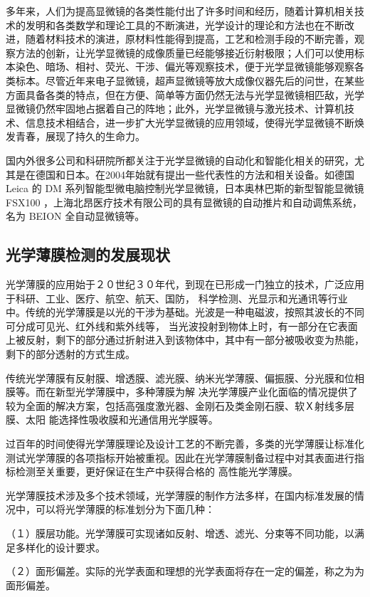 多年来，人们为提高显微镜的各类性能付出了许多时间和经历，随着计算机相关技术的发明和各类数学和理论工具的不断演进，光学设计的理论和方法也在不断改进，随着材料技术的演进，原材料性能得到提高，工艺和检测手段的不断完善，观察方法的创新，让光学显微镜的成像质量已经能够接近衍射极限；人们可以使用标本染色、暗场、相衬、荧光、干涉、偏光等观察技术，便于光学显微镜能够观察各类标本。尽管近年来电子显微镜，超声显微镜等放大成像仪器先后的问世，在某些方面具备各类的特点，但在方便、简单等方面仍然无法与光学显微镜相匹敌，光学显微镜仍然牢固地占据着自己的阵地；此外，光学显微镜与激光技术、计算机技术、信息技术相结合，进一步扩大光学显微镜的应用领域，使得光学显微镜不断焕发青春，展现了持久的生命力。

国内外很多公司和科研院所都关注于光学显微镜的自动化和智能化相关的研究，尤其是在德国和日本。在2004年始就有提出一些代表性的方法和相关设备。如德国 Leica 的 DM 系列智能型微电脑控制光学显微镜，日本奥林巴斯的新型智能显微镜 FSX100 ，上海北昂医疗技术有限公司的具有显微镜的自动推片和自动调焦系统，名为 BEION 全自动显微镜等。

\subsection{光学薄膜检测的发展现状}
光学薄膜的应用始于２０世纪３０年代，到现在已形成一门独立的技术，广泛应用于科研、工业、医疗、航空、航天、国防，
科学检测、光显示和光通讯等行业中\cite{baomo2002}。传统的光学薄膜是以光的干涉为基础。光波是一种电磁波，按照其波长的不同可分成可见光、红外线和紫外线等，
当光波投射到物体上时，有一部分在它表面上被反射，剩下的部分通过折射进入到该物体中，其中有一部分被吸收变为热能，剩下的部分透射的方式生成。

传统光学薄膜有反射膜、增透膜、滤光膜、纳米光学薄膜、偏振膜、分光膜和位相膜等。而在新型光学薄膜中，多种薄膜为解
决光学薄膜产业化面临的情况提供了较为全面的解决方案，包括高强度激光器、金刚石及类金刚石膜、软Ｘ射线多层膜、太阳
能选择性吸收膜和光通信用光学膜等\cite{baomodev2012}。

过百年的时间使得光学薄膜理论及设计工艺的不断完善，多类的光学薄膜让标准化测试光学薄膜的各项指标开始被重视。因此在光学薄膜制备过程中对其表面进行指标检测至关重要，更好保证在生产中获得合格的 高性能光学薄膜。

光学薄膜技术涉及多个技术领域，光学薄膜的制作方法多样，在国内标准发展的情况中，可以将光学薄膜的标准划分为下面几种：

（１）膜层功能。光学薄膜可实现诸如反射、增透、滤光、分束等不同功能，以满足多样化的设计要求。

（２）面形偏差。实际的光学表面和理想的光学表面将存在一定的偏差，称之为为面形偏差。

